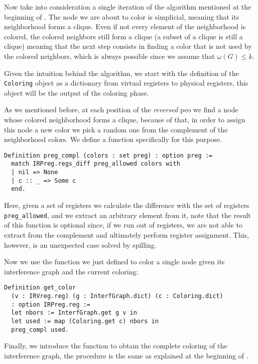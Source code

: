 Now take into consideration a single iteration of the algorithm mentioned at the beginning of . The node we are about to color is simplicial, meaning that its neighborhood forms a clique. Even if not every element of the neighborhood is colored, the colored neighbors still form a clique (a subset of a clique is still a clique) meaning that the next step consists in finding a color that is not used by the colored neighbors, which is always possible since we assume that $\omega(G) \leq k$.

Given the intuition behind the algorithm, we start with the definition of the \texttt{Coloring} object as a dictionary from virtual registers to physical registers, this object will be the output of the coloring phase.

As we mentioned before, at each position of the \textit{reversed} \gls{peo} we find a node whose colored neighborhood forms a clique, because of that, in order to assign this node a new color we pick a random one from the complement of the neighborhood colors. We define a function specifically for this purpose.

\begin{lstlisting}[style=Rocq]
Definition preg_compl (colors : set preg) : option preg :=
  match IRPreg.regs_diff preg_allowed colors with
  | nil => None
  | c :: _ => Some c
  end.
\end{lstlisting}

Here, given a set of registers we calculate the difference with the set of registers \texttt{preg\_allowed}, and we extract an arbitrary element from it, note that the result of this function is optional since, if we run out of registers, we are not able to extract from the complement and ultimately perform register assignment. This, however, is an unexpected case solved by spilling.

Now we use the function we just defined to color a single node given its interference graph and the current coloring:

\begin{lstlisting}[style=Rocq]
Definition get_color
  (v : IRVreg.reg) (g : InterfGraph.dict) (c : Coloring.dict)
  : option IRPreg.reg :=
  let nbors := InterfGraph.get g v in
  let used := map (Coloring.get c) nbors in
  preg_compl used.
\end{lstlisting}

Finally, we introduce the function to obtain the complete coloring of the interference graph, the procedure is the same as explained at the beginning of .

